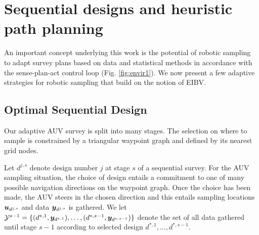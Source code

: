 \documentclass[aoas]{imsart}
\begin{document}

\section{Sequential designs and heuristic path planning}\label{sec:heuristics}

An important concept underlying this work is the potential of robotic
sampling to adapt survey plans based on data and statistical methods
in accordance with the sense-plan-act control loop
(Fig. \ref{fig:envir1}). We now present a few adaptive strategies for
robotic sampling that build on the notion of EIBV.

\subsection{Optimal Sequential Design}
\label{Optdes}

Our adaptive AUV survey is split into many stages. The selection on
where to sample is constrained by a triangular waypoint graph and
defined by its nearest grid nodes.

Let $d^{j,s}$ denote design number $j$ at stage $s$ of a sequential
survey. For the AUV sampling situation, the choice of design entails a commitment to one of many possible navigation directions on the waypoint graph. Once the choice has been made, the AUV steers in the chosen direction and this entails sampling locations ${\boldsymbol u}_{d^{j,s}}$ and data ${\boldsymbol y}_{d^{j,s}}$ is gathered.  We let
$\mathcal{Y}^{s-1} =\{(d^{*,1}, {\boldsymbol y}_{d^{*,1}}),\ldots, (d^{*,s-1},
{\boldsymbol y}_{d^{*,s-1}}) \}$ denote the set of all data gathered until stage
$s-1$ according to selected design $d^{*,1},\ldots,d^{*,s-1}$.  
\end{document}
